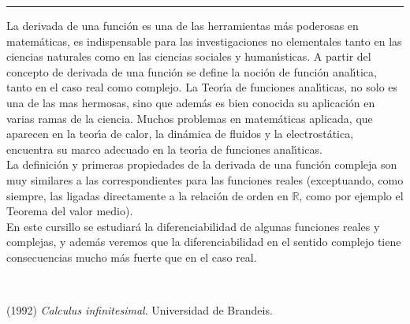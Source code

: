 \begin{titlepage}
\begin{minipage}{0.5\linewidth}
\begin{minipage}{0.45\linewidth}
    \begin{flushright}
        \printauthor
    \end{flushright}
\end{minipage} \hspace{0pt}
%
\begin{minipage}{0.02\linewidth}
      \color{ptctitle} \rule{1pt}{175pt}
\end{minipage} 
\end{minipage}
\hspace*{-4.5cm}
%
\begin{minipage}{0.85\linewidth}
\begin{minipage}{0.85\linewidth}
\footnotesize
\vspace{5pt}
    \begin{resumen} 
La derivada de una funci\'{o}n es una de las herramientas m\'{a}s poderosas en matem\'{a}ticas, es indispensable para las investigaciones no elementales tanto en las ciencias naturales como en las ciencias sociales y human\'{\i}sticas. A partir del concepto de derivada de una funci\'{o}n se define la noci\'{o}n de funci\'{o}n anal\'{\i}tica, tanto en el caso real como complejo. La Teor\'{\i}a de funciones anal\'{\i}ticas, no solo es una de las mas hermosas, sino que adem\'{a}s es bien conocida su aplicaci\'{o}n en varias ramas de la ciencia. Muchos problemas en matem\'{a}ticas aplicada, que aparecen en la teor\'{\i}a de calor, la din\'{a}mica de fluidos y la electrost\'{a}tica, encuentra su marco adecuado en la teor\'{\i}a de funciones anal\'{\i}ticas.\\
La definici\'{o}n y primeras propiedades de la derivada de una funci\'{o}n compleja son muy similares a las correspondientes para las funciones reales (exceptuando, como siempre, las ligadas directamente a la relaci\'{o}n de orden en $\mathbb{R}$, como por ejemplo el Teorema del valor medio).\\
En este cursillo se estudiar\'{a} la diferenciabilidad de algunas funciones reales y complejas, y adem\'{a}s veremos que la diferenciabilidad en el sentido complejo tiene consecuencias mucho m\'{a}s fuerte que en el caso real.

    \end{resumen}
   \end{minipage}
   \vspace{10pt}
\end{minipage}
\vspace{10pt}\\[5pt]
\begin{thebibliography}{99}
 (1992) {\it Calculus infinitesimal}. Universidad de Brandeis.
\end{thebibliography}
\end{titlepage}
